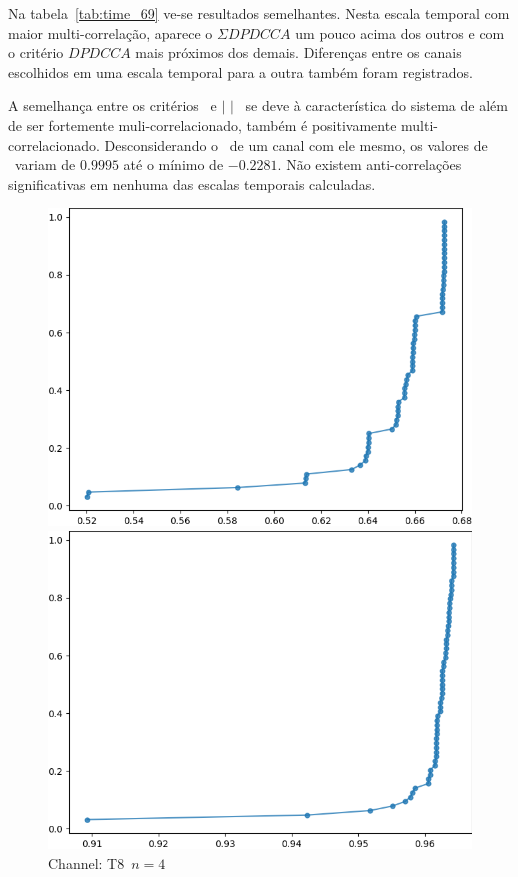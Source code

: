   Na tabela~\ref{tab:time_69} ve-se resultados semelhantes. Nesta escala temporal com maior multi-correlação, aparece o $\Sigma DPDCCA$ um pouco acima dos outros e com o critério $DPDCCA$ mais próximos dos demais. Diferenças entre os canais escolhidos em uma escala temporal para a outra também foram registrados.

  A semelhança entre os critérios \pdcca~e $|$ \pdcca $|$~ se deve à característica do sistema de além de ser fortemente muli-correlacionado, também é positivamente multi-correlacionado. Desconsiderando o \pdcca~de um canal com ele mesmo, os valores de \pdcca~variam de $0.9995$ até o mínimo de $-0.2281$. Não existem anti-correlações significativas em nenhuma das escalas temporais calculadas.
  
\begin{figure}[ht]
  \begin{minipage}[b]{0.45\textwidth}
    \includegraphics[width=\textwidth]{../Figures/test_dmc/pdcca_of_T8.._n_4.png}
    \caption{Channel: T8~$n = 4$}
  \end{minipage}
  \hfill
  \begin{minipage}[b]{0.45\textwidth}
    \includegraphics[width=\textwidth]{../Figures/test_dmc/pdcca_of_T8.._n_69.png}

\end{minipage}
\end{figure}
